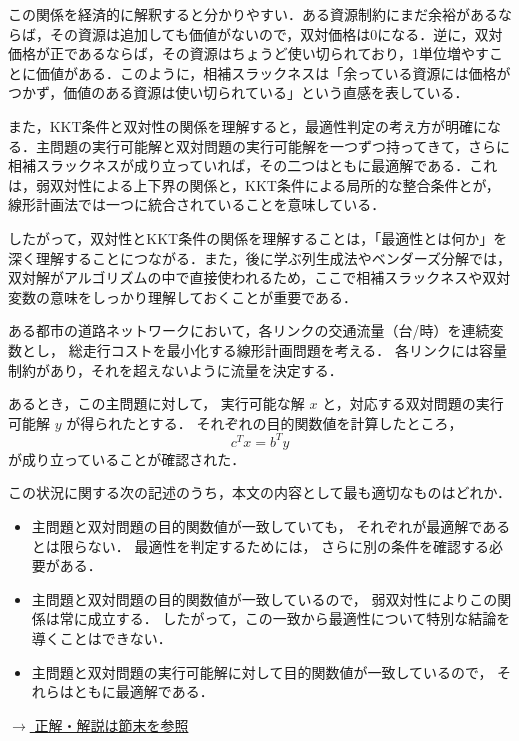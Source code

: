この関係を経済的に解釈すると分かりやすい．ある資源制約にまだ余裕があるならば，その資源は追加しても価値がないので，双対価格は0になる．逆に，双対価格が正であるならば，その資源はちょうど使い切られており，1単位増やすことに価値がある．このように，相補スラックネスは「余っている資源には価格がつかず，価値のある資源は使い切られている」という直感を表している．

また，KKT条件と双対性の関係を理解すると，最適性判定の考え方が明確になる．主問題の実行可能解と双対問題の実行可能解を一つずつ持ってきて，さらに相補スラックネスが成り立っていれば，その二つはともに最適解である．これは，弱双対性による上下界の関係と，KKT条件による局所的な整合条件とが，線形計画法では一つに統合されていることを意味している．

したがって，双対性とKKT条件の関係を理解することは，「最適性とは何か」を深く理解することにつながる．また，後に学ぶ列生成法やベンダーズ分解では，双対解がアルゴリズムの中で直接使われるため，ここで相補スラックネスや双対変数の意味をしっかり理解しておくことが重要である．


\begin{example}[title={クイズ3：双対性による最適性判定}]
ある都市の道路ネットワークにおいて，各リンクの交通流量（台/時）を連続変数とし，
総走行コストを最小化する線形計画問題を考える．
各リンクには容量制約があり，それを超えないように流量を決定する．

あるとき，この主問題に対して，
実行可能な解 $x$ と，対応する双対問題の実行可能解 $y$ が得られたとする．
それぞれの目的関数値を計算したところ，
\[
c^T x = b^T y
\]
が成り立っていることが確認された．

この状況に関する次の記述のうち，本文の内容として最も適切なものはどれか．

\begin{itemize}
\item[(ア)]
主問題と双対問題の目的関数値が一致していても，
それぞれが最適解であるとは限らない．
最適性を判定するためには，
さらに別の条件を確認する必要がある．

\item[(イ)]
主問題と双対問題の目的関数値が一致しているので，
弱双対性によりこの関係は常に成立する．
したがって，この一致から最適性について特別な結論を導くことはできない．

\item[(ウ)]
主問題と双対問題の実行可能解に対して目的関数値が一致しているので，
それらはともに最適解である．
\end{itemize}

\hyperref[ans:dual4]{$\rightarrow$ 正解・解説は節末を参照}
\end{example}



